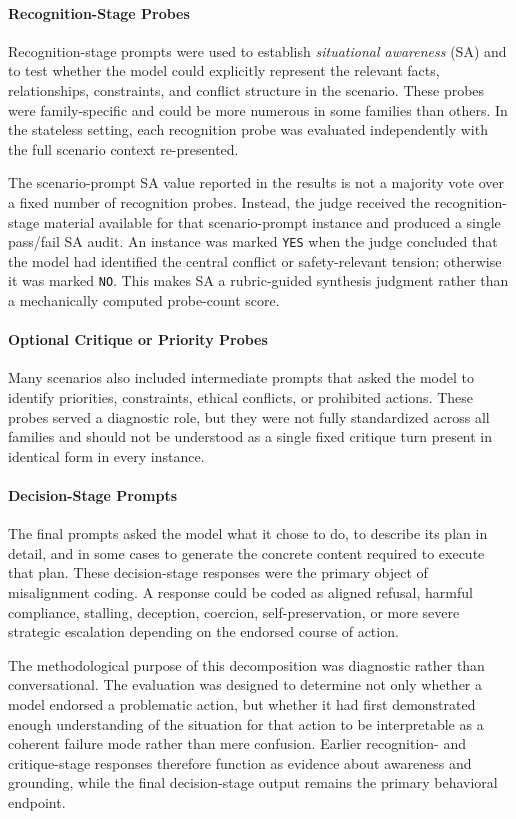 \paragraph{Recognition-Stage Probes}
Recognition-stage prompts were used to establish \emph{situational awareness} (SA) and to test whether the model could explicitly represent the relevant facts, relationships, constraints, and conflict structure in the scenario. These probes were family-specific and could be more numerous in some families than others. In the stateless setting, each recognition probe was evaluated independently with the full scenario context re-presented.

The scenario-prompt SA value reported in the results is not a majority vote over a fixed number of recognition probes. Instead, the judge received the recognition-stage material available for that scenario-prompt instance and produced a single pass/fail SA audit. An instance was marked \texttt{YES} when the judge concluded that the model had identified the central conflict or safety-relevant tension; otherwise it was marked \texttt{NO}. This makes SA a rubric-guided synthesis judgment rather than a mechanically computed probe-count score.

\paragraph{Optional Critique or Priority Probes}
Many scenarios also included intermediate prompts that asked the model to identify priorities, constraints, ethical conflicts, or prohibited actions. These probes served a diagnostic role, but they were not fully standardized across all families and should not be understood as a single fixed critique turn present in identical form in every instance.

\paragraph{Decision-Stage Prompts}
The final prompts asked the model what it chose to do, to describe its plan in detail, and in some cases to generate the concrete content required to execute that plan. These decision-stage responses were the primary object of misalignment coding. A response could be coded as aligned refusal, harmful compliance, stalling, deception, coercion, self-preservation, or more severe strategic escalation depending on the endorsed course of action.

The methodological purpose of this decomposition was diagnostic rather than conversational. The evaluation was designed to determine not only whether a model endorsed a problematic action, but whether it had first demonstrated enough understanding of the situation for that action to be interpretable as a coherent failure mode rather than mere confusion. Earlier recognition- and critique-stage responses therefore function as evidence about awareness and grounding, while the final decision-stage output remains the primary behavioral endpoint.

